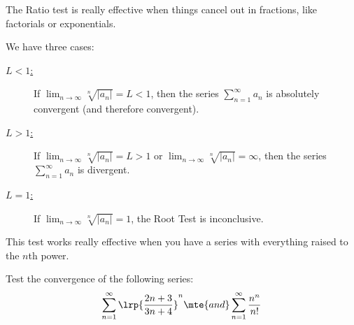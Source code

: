 \begin{aun}
The Ratio test is really effective when things cancel out in fractions, like factorials or exponentials. 
\end{aun}

\begin{thm} We have three cases:
\begin{description}
\item[\underline{$L < 1$:}] If $\lim _{n \rightarrow \infty} \sqrt[n]{\left|a_n\right|}=L<1$, then the series $\sum_{n=1}^{\infty} a_n$ is absolutely convergent (and therefore convergent).
\item[\underline{$L > 1$:}] If $\lim _{n \rightarrow \infty} \sqrt[n]{\left|a_n\right|}=L>1$ or $\lim _{n \rightarrow \infty} \sqrt[n]{\left|a_n\right|}=\infty$, then the series $\sum_{n=1}^{\infty} a_n$ is divergent.
\item[\underline{$L = 1$:}] If $\lim _{n \rightarrow \infty} \sqrt[n]{\left|a_n\right|}=1$, the Root Test is inconclusive.
\end{description}
\end{thm}

\begin{aun}
This test works really effective when you have a series with everything raised to the $n$th power. 
\end{aun}

\begin{exx}
Test the convergence of the following series:
\[
\sum_{n = 1}^\infty \lrp{\frac{2n+3}{3n+4}}^n \mte{ and } \sum_{n = 1}^\infty \frac{n^n}{n!}
\]
\end{exx}



